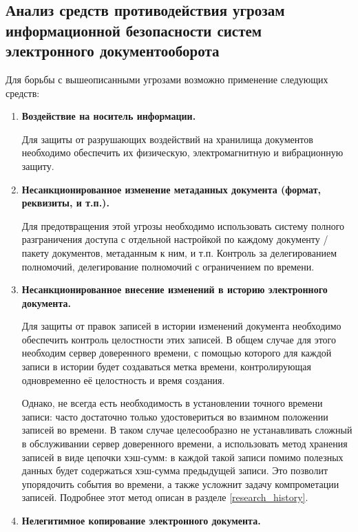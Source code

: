 \subsection{Анализ средств противодействия угрозам информационной безопасности систем электронного документооборота} \label{threats_neutralizers}

Для борьбы с вышеописанными угрозами возможно применение следующих средств:
\begin{enumerate}
	\item \textbf{Воздействие на носитель информации.}

	Для защиты от разрушающих воздействий на хранилища документов необходимо обеспечить их физическую, электромагнитную и вибрационную защиту.

	\item \textbf{Несанкционированное изменение метаданных документа (формат, реквизиты, и т.п.).}

	Для предотвращения этой угрозы необходимо использовать систему полного разграничения доступа с отдельной настройкой по каждому документу / пакету документов, метаданным к ним, и т.п. Контроль за делегированием полномочий, делегирование полномочий с ограничением по времени.

	\item \textbf{Несанкционированное внесение изменений в историю электронного документа.}

	Для защиты от правок записей в истории изменений документа необходимо обеспечить контроль целостности этих записей. В общем случае для этого необходим сервер доверенного времени, с помощью которого для каждой записи в истории будет создаваться метка времени, контролирующая одновременно её целостность и время создания.

	\vspace{\baselineskip}
	Однако, не всегда есть необходимость в установлении точного времени записи: часто достаточно только удостовериться во взаимном положении записей во времени. В таком случае целесообразно не устанавливать сложный в обслуживании сервер доверенного времени, а использовать метод хранения записей в виде цепочки хэш-сумм: в каждой такой записи помимо полезных данных будет содержаться хэш-сумма предыдущей записи. Это позволит упорядочить события во времени, а также усложнит задачу компрометации записей. Подробнее этот метод описан в разделе \ref{research_history}.

	\item \textbf{Нелегитимное копирование электронного документа.}


\end{enumerate}

